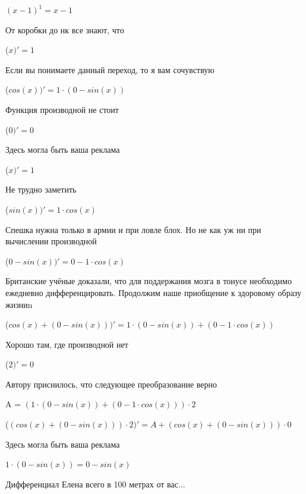 \documentclass[12pt,a4paper,fleqn]{article}
\begin{document}
\begin{center}
$(x-1)^{1} = x-1$\end{center}
От коробки до нк все знают, что

\begin{center}
 ($x)'
  = 1$\end{center}
Если вы понимаете данный переход, то я вам сочувствую

\begin{center}
 ($cos(x))'
  = 1 \cdot (0-sin(x))$\end{center}
Функция производной не стоит\cite{link2}

\begin{center}
 ($0)'
  = 0$\end{center}
Здесь могла быть ваша реклама

\begin{center}
 ($x)'
  = 1$\end{center}
Не трудно заметить

\begin{center}
 ($sin(x))'
  = 1 \cdot cos(x)$\end{center}
Спешка нужна только в армии и при ловле блох. Но не как уж ни при вычислении производной\cite{link2}

\begin{center}
 ($0-sin(x))'
  = 0-1 \cdot cos(x)$\end{center}
Британские учёные доказали, что для поддержания мозга в тонусе необходимо ежедневно дифференцировать. Продолжим наше приобщение к здоровому образу жизниn

\begin{center}
 ($cos(x)+(0-sin(x)))'
  = 1 \cdot (0-sin(x))+(0-1 \cdot cos(x))$\end{center}
Хорошо там, где производной нет\cite{link2}

\begin{center}
 ($2)'
  = 0$\end{center}
Автору приснилось, что следующее преобразование верно

\begin{center}
A = $(1 \cdot (0-sin(x))+(0-1 \cdot cos(x))) \cdot 2$\end{center}
\begin{center}
 ($(cos(x)+(0-sin(x))) \cdot 2)'
  = A+(cos(x)+(0-sin(x))) \cdot 0$\end{center}
Здесь могла быть ваша реклама

\begin{center}
$1 \cdot (0-sin(x)) = 0-sin(x)$\end{center}
Дифференциал Елена всего в 100 метрах от вас...
\end{document}
